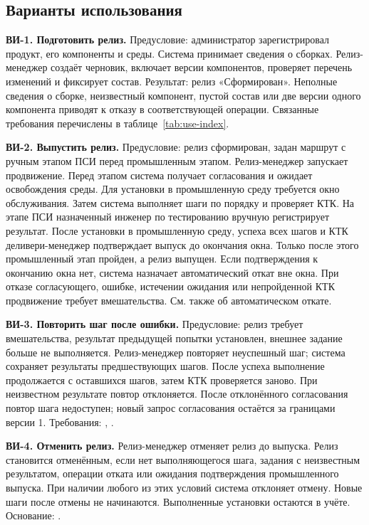 \documentclass{tpks}
\begin{document}
\subsection{Варианты использования}

\textbf{ВИ-1. Подготовить релиз.} Предусловие: администратор зарегистрировал продукт,
его компоненты и среды. Система принимает сведения о сборках. Релиз-менеджер создаёт
черновик, включает версии компонентов, проверяет перечень изменений и фиксирует состав.
Результат: релиз «Сформирован». Неполные сведения о сборке, неизвестный компонент,
пустой состав или две версии одного компонента приводят к отказу в соответствующей операции.
Связанные требования перечислены в таблице~\ref{tab:use-index}.

\textbf{ВИ-2. Выпустить релиз.} Предусловие: релиз сформирован, задан маршрут с
ручным этапом ПСИ перед промышленным этапом. Релиз-менеджер запускает продвижение.
Перед этапом система получает согласования и ожидает освобождения среды.
Для установки в промышленную среду требуется окно обслуживания.
Затем система выполняет шаги по порядку и проверяет КТК.
На этапе ПСИ назначенный инженер по тестированию вручную регистрирует результат.
После установки в промышленную среду, успеха всех шагов и КТК
деливери-менеджер подтверждает выпуск до окончания окна. Только после этого
промышленный этап пройден, а релиз выпущен. Если подтверждения к окончанию окна нет,
система назначает автоматический откат вне окна. При отказе согласующего, ошибке, истечении ожидания или
непройденной КТК продвижение требует вмешательства. См. также  об автоматическом откате.

\textbf{ВИ-3. Повторить шаг после ошибки.} Предусловие: релиз требует вмешательства,
результат предыдущей попытки установлен, внешнее задание больше не выполняется.
Релиз-менеджер повторяет неуспешный шаг; система сохраняет результаты предшествующих шагов.
После успеха выполнение продолжается с оставшихся шагов, затем КТК проверяется заново.
При неизвестном результате повтор отклоняется. После отклонённого согласования повтор
шага недоступен; новый запрос согласования остаётся за границами версии 1.
Требования: , .

\textbf{ВИ-4. Отменить релиз.} Релиз-менеджер отменяет релиз до выпуска.
Релиз становится отменённым, если нет выполняющегося шага, задания с неизвестным
результатом, операции отката или ожидания подтверждения промышленного выпуска.
При наличии любого из этих условий система отклоняет отмену. Новые шаги после отмены не начинаются. Выполненные установки
остаются в учёте. Основание: .
\end{document}
